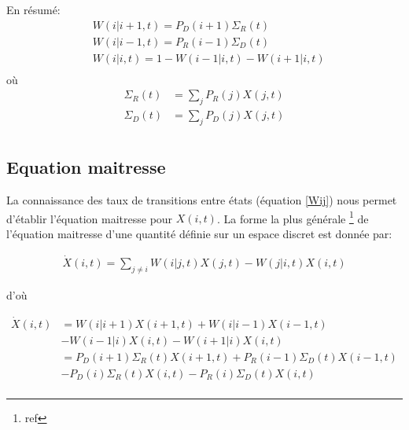 En résumé:
\begin{equation}
\begin{aligned}
&W(i|i+1,t)= P_D(i+1) \Sigma_R(t)\\
&W(i|i-1,t)= P_R(i-1) \Sigma_D(t)\\
&W(i|i,t) = 1- W(i-1|i,t)- W(i+1|i,t)\\
\label{TransitionVoisins}
\end{aligned}
\end{equation}
où
\begin{equation}
\begin{aligned}
\Sigma_R	(t)	&= \sum_j P_R(j) X(j,t)\\
\Sigma_D(t) 	&= \sum_j P_D(j) X(j,t)\\
\label{SigmaRD}
\end{aligned}
\end{equation}



\subsection{Equation maitresse}

La connaissance des taux de transitions entre états (équation \ref{Wij}) nous permet d'établir l'équation maitresse pour $X(i,t)$. La forme la plus générale \footnote{ref \fixme} de l'équation maitresse d'une quantité définie sur un espace discret est donnée par:

\begin{equation}
\begin{aligned}
\dot{X}(i,t)= \sum_{j\neq i} W(i|j,t)X(j,t)-W(j|i,t)X(i,t)
\label{MasterGeneral}
\end{aligned}
\end{equation}

d'où

\begin{equation}
\begin{aligned}
\dot{X}(i,t)&= W(i|i+1) X(i+1,t) + W(i|i-1) X(i-1,t)\\
					&-W(i-1|i) X(i,t) -W(i+1|i) X(i,t)\\
		    &= P_D(i+1) \Sigma_R(t) X(i+1,t) + P_R(i-1) \Sigma_D(t) X(i-1,t)\\
					&-P_D(i) \Sigma_R(t) X(i,t) -P_R(i) \Sigma_D(t) X(i,t)\\
\label{Master}
\end{aligned}
\end{equation}

